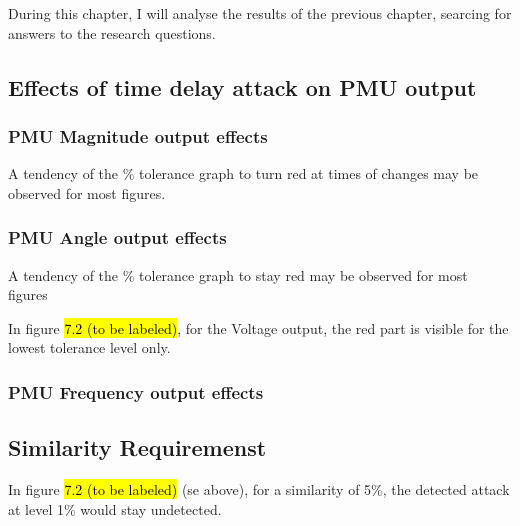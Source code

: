 During this chapter, I will analyse the results of the previous chapter, searcing for answers to the research questions.

\subsection{Effects of time delay attack on PMU output}

\subsubsection{PMU Magnitude output effects}
A tendency of the \% tolerance graph to turn red at times of changes may be observed for most figures.

\subsubsection{PMU Angle output effects}

A tendency of the \% tolerance graph to stay red may be observed for most figures

In figure \hl{7.2 (to be labeled)}, for the Voltage output, the red part is visible for the lowest tolerance level only.
\subsubsection{PMU Frequency output effects}

\subsection{Similarity Requiremenst}
In figure \hl{7.2 (to be labeled)} (se above), for a similarity of 5\%, the detected attack at level 1\% would stay undetected. 